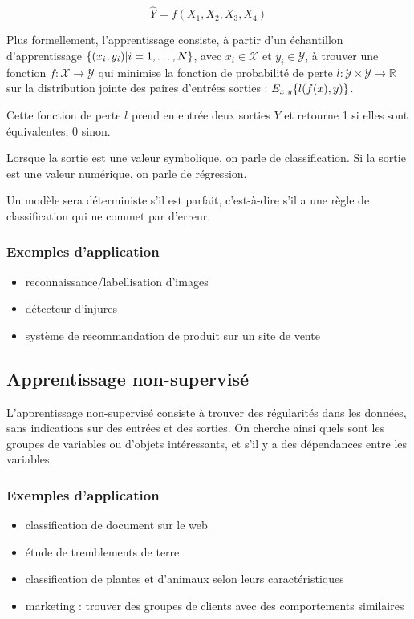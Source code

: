 		$$\hat{Y} = f(X_1, X_2, X_3, X_4)$$

		Plus formellement, l'apprentissage consiste, à partir d'un échantillon d'apprentissage $\lbrace (x_i, y_i) \vert i = 1, \dots , N \rbrace$, avec $x_i \in \mathcal{X}$ et $y_i \in \mathcal{Y}$, à trouver une fonction $f : \mathcal{X} \rightarrow \mathcal{Y}$ qui minimise la fonction de probabilité de perte $l : \mathcal{Y} \times \mathcal{Y} \rightarrow \mathbb{R}$ sur la distribution jointe des paires d'entrées sorties : $E_{x, y} \lbrace l(f(x), y) \rbrace$.

		Cette fonction de perte $l$ prend en entrée deux sorties $Y$ et retourne 1 si elles sont équivalentes, 0 sinon.

		Lorsque la sortie est une valeur symbolique, on parle de classification. Si la sortie est une valeur numérique, on parle de régression.

		Un modèle sera déterministe s'il est parfait, c'est-à-dire s'il a une règle de classification qui ne commet par d'erreur.
		
		\subsubsection{Exemples d'application}
			
			\begin{itemize}
				\item reconnaissance/labellisation d'images
				\item détecteur d'injures
				\item système de recommandation de produit sur un site de vente
			\end{itemize}
		
		
		\subsection{Apprentissage non-supervisé}
		
		L'apprentissage non-supervisé consiste à trouver des régularités dans les données, sans indications sur des entrées et des sorties. On cherche ainsi quels sont les groupes de variables ou d'objets intéressants, et s'il y a des dépendances entre les variables.
		
			\subsubsection{Exemples d'application}
			
			\begin{itemize}
				\item classification de document sur le web
				\item étude de tremblements de terre
				\item classification de plantes et d'animaux selon leurs caractéristiques
				\item marketing : trouver des groupes de clients avec des comportements similaires
			\end{itemize}
		
